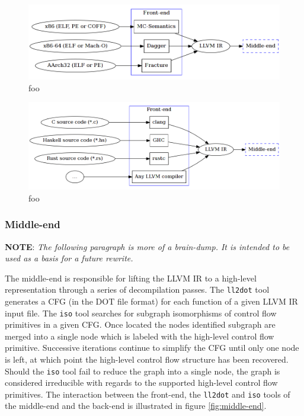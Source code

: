 
\begin{figure}[htbp]
	\begin{center}
		\includegraphics[width=\textwidth]{inc/front-end_binary.png}
		\caption{foo}
		\label{fig:front-end_binary}
	\end{center}
\end{figure}

\begin{figure}[htbp]
	\begin{center}
		\includegraphics[width=\textwidth]{inc/front-end_source.png}
		\caption{foo}
		\label{fig:front-end_source}
	\end{center}
\end{figure}

\subsubsection{Middle-end}



\textbf{NOTE}: \textit{The following paragraph is more of a brain-dump. It is intended to be used as a basis for a future rewrite.}

The middle-end is responsible for lifting the LLVM IR to a high-level representation through a series of decompilation passes. The \texttt{ll2dot} tool generates a CFG (in the DOT file format) for each function of a given LLVM IR input file. The \texttt{iso} tool searches for subgraph isomorphisms of control flow primitives in a given CFG. Once located the nodes identified subgraph are merged into a single node which is labeled with the high-level control flow primitive. Successive iterations continue to simplify the CFG until only one node is left, at which point the high-level control flow structure has been recovered. Should the \texttt{iso} tool fail to reduce the graph into a single node, the graph is considered irreducible with regards to the supported high-level control flow primitives. The interaction between the front-end, the \texttt{ll2dot} and \texttt{iso} tools of the middle-end and the back-end is illustrated in figure \ref{fig:middle-end}.

